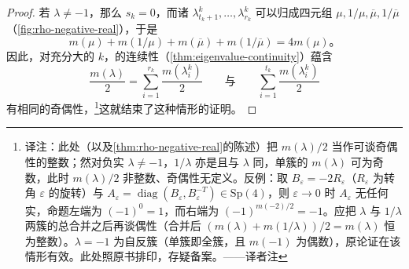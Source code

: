 \begin{proof}
若 $\lambda\neq-1$，那么 $s_k=0$，而诸\trEigenvalue{} $\lambda^k_{t_k+1},\dotsc,\lambda^k_{r_k}$ 可以归成四元组 $\mu,1/\mu,\overline{\mu},1/\overline{\mu}$（\cref{fig:rho-negative-real}），于是
\[
m(\mu)+m(1/\mu)+m(\overline{\mu})+m(1/\overline{\mu})=4m(\mu)\text{。}
\]
因此，对充分大的 $k$，\trEigenvalue{}的连续性（\cref{thm:eigenvalue-continuity}）蕴含
\[
\frac{m(\lambda)}{2}=\sum_{i=1}^{r_k}\frac{m(\lambda^k_i)}{2}
\qquad\text{与}\qquad
\sum_{i=1}^{t_k}\frac{m(\lambda^k_i)}{2}
\]
有相同的奇偶性，\footnote{译注：此处（以及\cref{thm:rho-negative-real}的陈述）把 $m(\lambda)/2$ 当作可谈奇偶性的整数；然对负实\trEigenvalue{} $\lambda\neq-1$，$1/\lambda$ 亦是\trEigenvalue{}且与 $\lambda$ 同\trMultiplicity，单簇的 $m(\lambda)$ 可为奇数，此时 $m(\lambda)/2$ 非整数、奇偶性无定义。反例：取 $B_\varepsilon=-2R_\varepsilon$（$R_\varepsilon$ 为转角 $\varepsilon$ 的旋转）与 $A_\varepsilon=\operatorname{diag}(B_\varepsilon,B_\varepsilon^{-T})\in\mathrm{Sp}(4)$，则 $\varepsilon\to0$ 时 $A_\varepsilon$ 无任何实\trEigenvalue，命题左端为 $(-1)^{0}=1$，而右端为 $(-1)^{m(-2)/2}=-1$。应把 $\lambda$ 与 $1/\lambda$ 两簇的总\trMultiplicity{}合并之后再谈偶性（合并后 $(m(\lambda)+m(1/\lambda))/2=m(\lambda)$ 恒为整数）。$\lambda=-1$ 为自反簇（单簇即全簇，且 $m(-1)$ 为偶数），原论证在该情形有效。此处照原书排印，存疑备案。——译者注}这就结束了这种情形的证明。


\end{proof}
